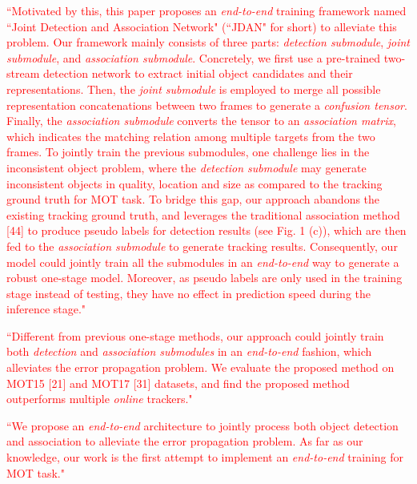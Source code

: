 \documentclass[12pt,journal,onecolumn]{IEEEtran}
\begin{document}
\textcolor{red}{
``Motivated by this, this paper proposes an \emph{end-to-end} training framework named ``Joint Detection and Association Network" (``JDAN" for short) to alleviate this problem. 
Our framework mainly consists of three parts: \emph{detection submodule}, \emph{joint submodule}, and \emph{association submodule}. 
Concretely, we first use a pre-trained two-stream detection network to extract initial object candidates and their representations. 
Then, the \emph{joint submodule} is employed to merge all possible representation concatenations between two frames to generate a \emph{confusion tensor}. 
Finally, the \emph{association submodule} converts the tensor to an \emph{association matrix}, which indicates the matching relation among multiple targets from the two frames. 
To jointly train the previous submodules, one challenge lies in the inconsistent object problem,
where the \emph{detection submodule} may generate inconsistent objects in quality, location and size as compared to the tracking ground truth for MOT task. 
To bridge this gap, our approach abandons the existing tracking ground truth,
and leverages the traditional association method [44] to produce pseudo labels for detection results (see Fig. 1 (c)), 
which are then fed to the \emph{association submodule} to generate tracking results. 
Consequently, our model could jointly train all the submodules in an \emph{end-to-end} way to generate a robust one-stage model. 
Moreover, as pseudo labels are only used in the training stage instead of testing, they have no effect in prediction speed during the inference stage."
}

\textcolor{red}{
``Different from previous one-stage methods, our approach could jointly train both \emph{detection} and \emph{association submodules} in an \emph{end-to-end} fashion,
which alleviates the error propagation problem. 
We evaluate the proposed method on MOT15 [21] and MOT17 [31] datasets, 
and find the proposed method outperforms multiple \emph{online} trackers."
}

\textcolor{red}{
``We propose an \emph{end-to-end} architecture to jointly process both object detection and association to alleviate the error propagation problem. As far as our knowledge, our work is the first attempt to implement an \emph{end-to-end} training for MOT task."
}

\end{document}
